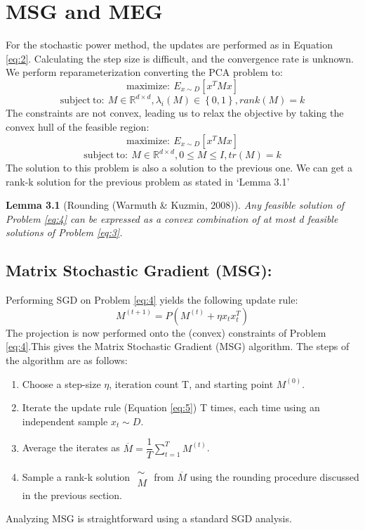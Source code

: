 \documentclass{article}
\begin{document}
\section{MSG and MEG}
For the stochastic power method, the updates are performed as in Equation \ref{eq:2}. Calculating the step size is difficult, and the convergence rate is unknown. We perform reparameterization converting the PCA problem to:
\begin{equation}\label{eq:3} 
\mathrm{maximize :\ }E_{x\sim D}\left[ x^{T}Mx\right]
\end{equation}
\begin{equation}
\mathrm{subject\ to :\ }M\in \mathbb{R} ^{d\times d},\lambda _{i}\left( M\right) \in \left\{ 0,1\right\} ,rank\left( M\right) =k
\end{equation}
The constraints are not convex, leading us to relax the objective by taking the convex hull of the feasible region:
\begin{equation}\label{eq:4} 
\mathrm{maximize :\ }E_{x\sim D}\left[ x^{T}Mx\right]
\end{equation}
\begin{equation}
\mathrm{subject\ to :\ }M\in \mathbb{R} ^{d\times d},0\leq M\leq I,tr\left( M\right) =k
\end{equation}
The solution to this problem is also a solution to the previous one. We can get a rank-k solution for the previous problem as stated in ‘Lemma 3.1’

\textbf{Lemma 3.1} (Rounding (Warmuth \& Kuzmin, 2008)). \textit{Any feasible solution of Problem \ref{eq:4} can be expressed as a convex combination of at most d feasible solutions of Problem \ref{eq:3}.}
\subsection{Matrix Stochastic Gradient (MSG):}
Performing SGD on Problem \ref{eq:4} yields the following update rule:
\begin{equation}\label{eq:5}
    M^{\left( t+1\right) }=P\left( M^{\left( t\right) }+\eta x_{t}x^{T}_{t}\right) 
\end{equation}
The projection is now performed onto the (convex) constraints of Problem \ref{eq:4}.This gives the Matrix Stochastic Gradient (MSG) algorithm. The steps of the algorithm are as follows:
\begin{enumerate}
    \item Choose a step-size $\eta$, iteration count T, and starting point $M^{(0)}$.
    \item Iterate the update rule (Equation \ref{eq:5}) T times, each time using an independent sample $x_{t}\sim D$.
    \item Average the iterates as $\overline {M}=\dfrac {1}{T}\sum ^{T}_{t=1}M^{\left( t\right) }$.
    \item Sample a rank-k solution $\begin{aligned}\sim \\
M\end{aligned}$ from $\overline {M}$ using the rounding procedure discussed in the previous section.
\end{enumerate}
Analyzing MSG is straightforward using a standard SGD analysis.
\end{document}

